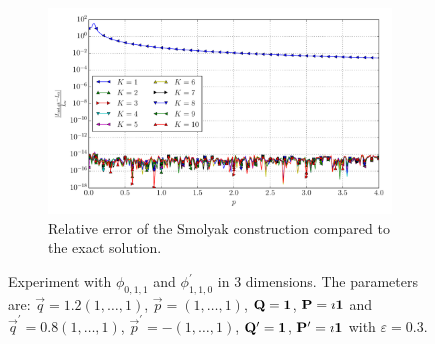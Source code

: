 \documentclass[a4paper,10pt]{article}
\begin{document}
\begin{figure}[ht!]
\begin{subfigure}[t]{0.5\linewidth}
    \includegraphics[width=\linewidth]{./plots/tp_sg_3d_conv_p_(0,1,1)_(1,1,0)_err_rel_nsd_gk.pdf}
    \caption{Relative error of the Smolyak construction compared to the exact solution.}
    \label{fig:tp_sg_3d_conv_p_011_110_err_rel_nsd_gk}
  \end{subfigure}
  \label{fig:tp_sg_3d_conv_p_011_110}
  \caption{Experiment with $\phi_{0,1,1}$ and $\phi_{1,1,0}^{\prime}$
  in 3 dimensions.
  The parameters are:
  $\vec{q} = 1.2 (1,\ldots,1)$,
  $\vec{p} = (1,\ldots,1)$,
  $\mathbf{Q} = \mathbf{1}$,
  $\mathbf{P} = \imath \mathbf{1}$
  and
  $\vec{q}^\prime = 0.8 (1,\ldots,1)$,
  $\vec{p}^\prime = -(1,\ldots,1)$,
  $\mathbf{Q}^\prime = \mathbf{1}$,
  $\mathbf{P}^\prime = \imath \mathbf{1}$
  with $\varepsilon=0.3$.}
\end{figure}
\end{document}
